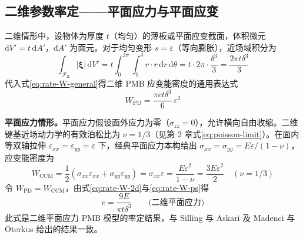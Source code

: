 \subsection{二维参数率定——平面应力与平面应变}

二维情形中，设物体为厚度 $t$（均匀）的薄板或平面应变截面，体积微元 $\mathrm{d}V'=t\,\mathrm{d}A'$，$\mathrm{d}A'$ 为面元。对于均匀变形 $s=\varepsilon$（等向膨胀），近场域积分为
\begin{equation}
\int_{\mathcal{F}_{\mathbf{x}}} |\boldsymbol{\xi}|\,\mathrm{d}V' = t\int_{0}^{2\pi}\!\int_{0}^{\delta} r\cdot r\,\mathrm{d}r\,\mathrm{d}\theta
= t\cdot 2\pi\cdot\frac{\delta^{3}}{3} = \frac{2\pi t\delta^{3}}{3}
\label{eq:rate-integral-2d}
\end{equation}
代入式\eqref{eq:rate-W-general}得二维 PMB 应变能密度的通用表达式
\begin{equation}
W_{\mathrm{PD}} = \frac{\pi c t\delta^{3}}{6}\,\varepsilon^{2}
\label{eq:rate-W-2d}
\end{equation}

\textbf{平面应力情形。}平面应力假设面外应力为零（$\sigma_{zz}=0$），允许横向自由收缩。二维键基近场动力学的有效泊松比为 $\nu=1/3$（见第 2 章式\eqref{eq:poisson-limit}）。在面内等双轴拉伸 $\varepsilon_{xx}=\varepsilon_{yy}=\varepsilon$ 下，经典平面应力本构给出 $\sigma_{xx}=\sigma_{yy}=E\varepsilon/(1-\nu)$，应变能密度为
\begin{equation}
W_{\mathrm{CCM}} = \frac{1}{2}(\sigma_{xx}\varepsilon_{xx}+\sigma_{yy}\varepsilon_{yy})
= \sigma_{xx}\varepsilon = \frac{E\varepsilon^{2}}{1-\nu}
= \frac{3E\varepsilon^{2}}{2}\quad(\nu=1/3)
\label{eq:rate-W-ps}
\end{equation}
令 $W_{\mathrm{PD}}=W_{\mathrm{CCM}}$，由式\eqref{eq:rate-W-2d}与\eqref{eq:rate-W-ps}得
\begin{equation}
c = \frac{9E}{\pi t\delta^{3}} \qquad \text{(二维平面应力)}
\label{eq:rate-2d-ps}
\end{equation}
此式是二维平面应力 PMB 模型的率定结果，与 Silling 与 Askari \cite{SillingAskari2005} 及 Madenci 与 Oterkus \cite{MadenciOterkus2014} 给出的结果一致。


